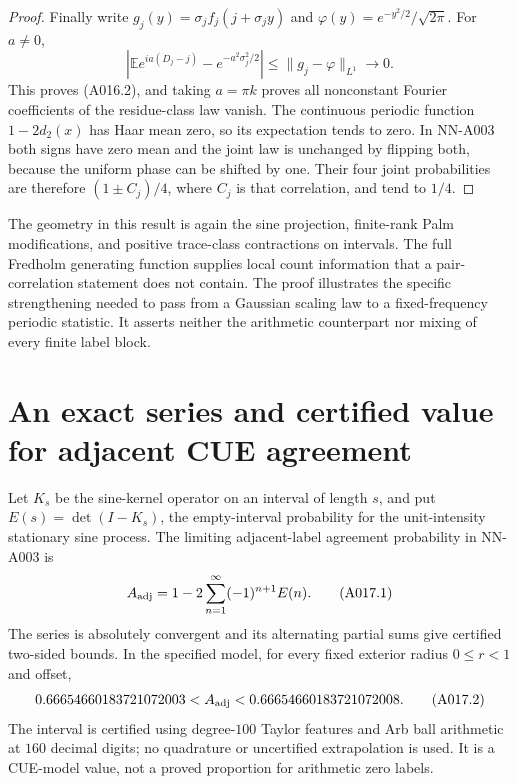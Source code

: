 \begin{proof}
Finally write $g_j(y)=\sigma_j f_j(j+\sigma_j y)$ and
$\varphi(y)=e^{-y^2/2}/\sqrt{2\pi}$. For $a\ne0$,
\[
 \left|\mathbb E e^{ia(D_j-j)}-e^{-a^2\sigma_j^2/2}\right|
 \le\|g_j-\varphi\|_{L^1}\longrightarrow0.
\]
This proves (A016.2), and taking $a=\pi k$ proves all nonconstant
Fourier coefficients of the residue-class law vanish. The continuous
periodic function $1-2d_2(x)$ has Haar mean zero, so its expectation
tends to zero. In NN-A003 both signs have zero mean and the joint
law is unchanged by flipping both, because the uniform phase can
be shifted by one. Their four joint probabilities are therefore
$(1\pm C_j)/4$, where $C_j$ is that correlation, and tend to $1/4$.
\end{proof}

The geometry in this result is again the sine projection, finite-rank
Palm modifications, and positive trace-class contractions on intervals.
The full Fredholm generating function supplies local count information
that a pair-correlation statement does not contain. The proof illustrates
the specific strengthening needed to pass from a Gaussian scaling law
to a fixed-frequency periodic statistic. It asserts neither the
arithmetic counterpart nor mixing of every finite label block.


\section{An exact series and certified value for adjacent CUE agreement}

\begin{theorem}
Let $K_s$ be the sine-kernel operator on an interval of length $s$,
and put $E(s)=\det(I-K_s)$, the empty-interval probability for the
unit-intensity stationary sine process. The limiting adjacent-label
agreement probability in NN-A003 is
\[
 A_{\rm adj}=1-2\sum_{n=1}^\infty(-1)^{n+1}E(n).
                                                        \tag{A017.1}
\]
The series is absolutely convergent and its alternating partial sums
give certified two-sided bounds. In the specified model, for every
fixed exterior radius $0\le r<1$ and offset,
\[
 0.66654660183721072003
 < A_{\rm adj} <
 0.66654660183721072008.                                \tag{A017.2}
\]
The interval is certified using degree-$100$ Taylor features and
Arb ball arithmetic at $160$ decimal digits; no quadrature or
uncertified extrapolation is used. It is a CUE-model value, not a
proved proportion for arithmetic zero labels.
\end{theorem}

